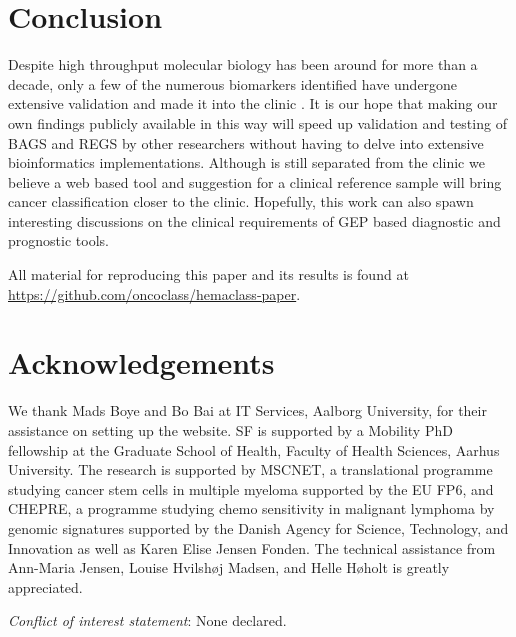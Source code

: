 \documentclass{article}
\begin{document}
\section{Conclusion}
Despite high throughput molecular biology has been around for more than a decade, only a few of the numerous biomarkers identified have undergone extensive validation and made it into the clinic \citep{Chen2012a}.
It is our hope that making our own findings publicly available in this way will speed up validation and testing of BAGS and REGS by other researchers without having to delve into extensive bioinformatics implementations.
Although \hemaClass{} is still separated from the clinic we believe a web based tool and suggestion for a clinical reference sample will bring cancer classification closer to the clinic.
Hopefully, this work can also spawn interesting discussions on the clinical requirements of GEP based diagnostic and prognostic tools.

All material for reproducing this paper and its results is found at \url{https://github.com/oncoclass/hemaclass-paper}.

{}
\section*{Acknowledgements}
We thank Mads Boye and Bo Bai at IT Services, Aalborg University, for their assistance on setting up the website.
SF is supported by a Mobility PhD fellowship at the Graduate School of Health, Faculty of Health Sciences, Aarhus University.
The research is supported by MSCNET, a translational programme studying cancer stem cells in multiple myeloma supported by the EU FP6, and CHEPRE, a programme studying chemo sensitivity in malignant lymphoma by genomic signatures supported by the Danish Agency for Science, Technology, and Innovation as well as Karen Elise Jensen Fonden.
The technical assistance from Ann-Maria Jensen, Louise Hvilsh{\o}j Madsen, and Helle H{\o}holt is greatly appreciated.



\noindent\textit{Conflict of interest statement}: None declared.
{}



\cleardoublepage

\renewcommand{\theequation}{S\arabic{equation}}
\renewcommand{\thefigure}{S\arabic{figure}}
\renewcommand{\thetable}{S\arabic{table}}
\renewcommand{\thesection}{S\arabic{section}}

\setcounter{section}{0}
\setcounter{subsection}{0}
\setcounter{equation}{0}
\setcounter{figure}{0}
\setcounter{table}{0}
\setcounter{page}{1}



\cleardoublepage
\listoftodos
\end{document}
